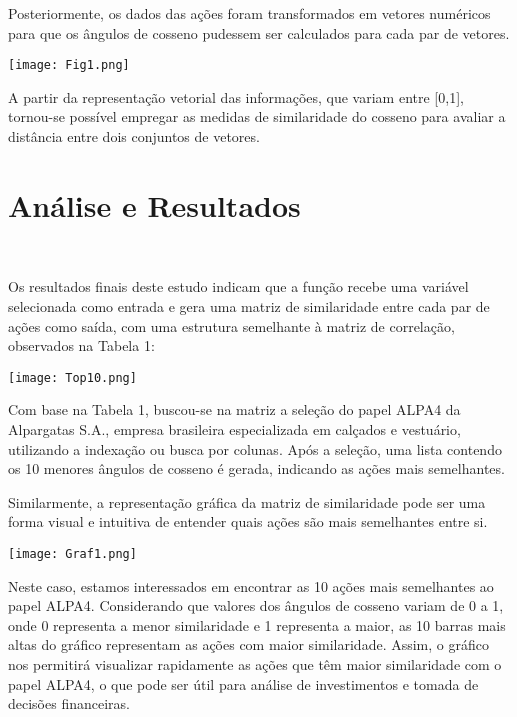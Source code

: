 \documentclass[12pt, a4paper]{article}
\begin{document}
Posteriormente, os dados das ações foram transformados em vetores numéricos para que os ângulos de cosseno pudessem ser calculados para cada par de vetores.

\begin{center}
    \texttt{[image: Fig1.png]}
\end{center}

A partir da representação vetorial das informações, que variam entre [0,1], tornou-se possível empregar as medidas de similaridade do cosseno para avaliar a distância entre dois conjuntos de vetores. 



\section{Análise e Resultados}\

Os resultados finais deste estudo indicam que a função recebe uma variável selecionada como entrada e gera uma matriz de similaridade entre cada par de ações como saída, com uma estrutura semelhante à matriz de correlação, observados na Tabela 1:\

\begin{center}
    \texttt{[image: Top10.png]}
\end{center}

Com base na Tabela 1, buscou-se na matriz a seleção do papel ALPA4 da Alpargatas S.A., empresa brasileira especializada em calçados e vestuário, utilizando a indexação ou busca por colunas. Após a seleção, uma lista contendo os 10 menores ângulos de cosseno é gerada, indicando as ações mais semelhantes.\

Similarmente, a representação gráfica da matriz de similaridade pode ser uma forma visual e intuitiva de entender quais ações são mais semelhantes entre si.

\begin{center}
    \texttt{[image: Graf1.png]}
\end{center}

Neste caso, estamos interessados em encontrar as 10 ações mais semelhantes ao papel ALPA4. Considerando que valores dos ângulos de cosseno variam de 0 a 1, onde 0 representa a menor similaridade e 1 representa a maior, as 10 barras mais altas do gráfico representam as ações com maior similaridade. Assim, o gráfico nos permitirá visualizar rapidamente as ações que têm maior similaridade com o papel ALPA4, o que pode ser útil para análise de investimentos e tomada de decisões financeiras.\
\end{document}
